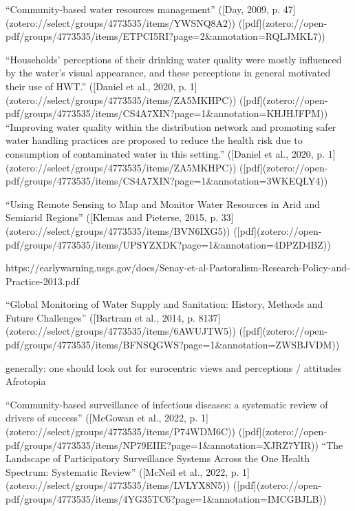 “Community-based water resources management” ([Day, 2009, p. 47](zotero://select/groups/4773535/items/YWSNQ8A2)) ([pdf](zotero://open-pdf/groups/4773535/items/ETPCI5RI?page=2&annotation=RQLJMKL7))

“Households’ perceptions of their drinking water quality were mostly influenced by the water’s visual appearance, and these perceptions in general motivated their use of HWT.” ([Daniel et al., 2020, p. 1](zotero://select/groups/4773535/items/ZA5MKHPC)) ([pdf](zotero://open-pdf/groups/4773535/items/CS4A7XIN?page=1&annotation=KHJHJFPM))
“Improving water quality within the distribution network and promoting safer water handling practices are proposed to reduce the health risk due to consumption of contaminated water in this setting.” ([Daniel et al., 2020, p. 1](zotero://select/groups/4773535/items/ZA5MKHPC)) ([pdf](zotero://open-pdf/groups/4773535/items/CS4A7XIN?page=1&annotation=3WKEQLY4))



“Using Remote Sensing to Map and Monitor Water Resources in Arid and Semiarid Regions” ([Klemas and Pieterse, 2015, p. 33](zotero://select/groups/4773535/items/BVN6IXG5)) ([pdf](zotero://open-pdf/groups/4773535/items/UPSYZXDK?page=1&annotation=4DPZD4BZ))

https://earlywarning.usgs.gov/docs/Senay-et-al-Pastoralism-Research-Policy-and-Practice-2013.pdf


“Global Monitoring of Water Supply and Sanitation: History, Methods and Future Challenges” ([Bartram et al., 2014, p. 8137](zotero://select/groups/4773535/items/6AWUJTW5)) ([pdf](zotero://open-pdf/groups/4773535/items/BFNSQGWS?page=1&annotation=ZWSBJVDM))

generally: one should look out for eurocentric views and perceptions / attitudes
Afrotopia

“Community-based surveillance of infectious diseases: a systematic review of drivers of success” ([McGowan et al., 2022, p. 1](zotero://select/groups/4773535/items/P74WDM6C)) ([pdf](zotero://open-pdf/groups/4773535/items/NP79EIIE?page=1&annotation=XJRZ7YIR))
“The Landscape of Participatory Surveillance Systems Across the One Health Spectrum: Systematic Review” ([McNeil et al., 2022, p. 1](zotero://select/groups/4773535/items/LVLYX8N5)) ([pdf](zotero://open-pdf/groups/4773535/items/4YG35TC6?page=1&annotation=IMCGBJLB))

